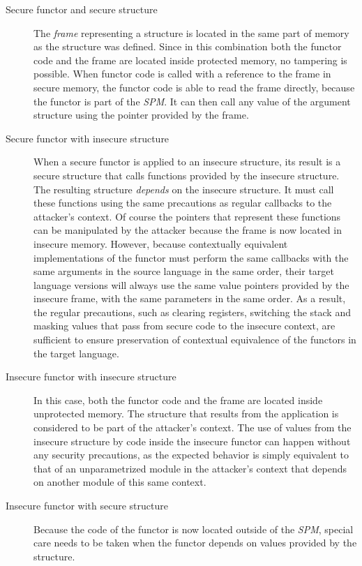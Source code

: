 \documentclass[10pt,a4paper,master=cws, masteroption=ai,english,inputenc=utf8]{kulemt}
\begin{document}
\begin{description}
\item[Secure functor and secure structure] 
The \emph{frame} representing a structure is located in the same part of memory as the structure was defined.
Since in this combination both the functor code and the frame are located inside protected memory, no tampering is possible.
When functor code is called with a reference to the frame in secure memory, the functor code is able to read the frame directly, because the functor is part of the \emph{SPM}. It can then call any value of the argument structure using the pointer provided by the frame.
\item[Secure functor with insecure structure]
When a secure functor is applied to an insecure structure, its result is a secure structure that calls functions provided by the insecure structure.
The resulting structure \emph{depends} on the insecure structure.
It must call these functions using the same precautions as regular callbacks to the attacker's context.
Of course the pointers that represent these functions can be manipulated by the attacker because the frame is now located in insecure memory.
However, because contextually equivalent implementations of the functor must perform the same callbacks with the same arguments in the source language in the same order, their target language versions will always use the same value pointers provided by the insecure frame, with the same parameters in the same order.
As a result, the regular precautions, such as clearing registers, switching the stack and masking values that pass from secure code to the insecure context, are sufficient to ensure preservation of contextual equivalence of the functors in the target language.
\item[Insecure functor with insecure structure]
In this case, both the functor code and the frame are located inside unprotected memory.
The structure that results from the application is considered to be part of the attacker's context.
The use of values from the insecure structure by code inside the insecure functor can happen without any security precautions, as the expected behavior is simply equivalent to that of an unparametrized module in the attacker's context that depends on another module of this same context.
\item[Insecure functor with secure structure]
Because the code of the functor is now located outside of the \emph{SPM}, special care needs to be taken when the functor depends on values provided by the structure.

\end{description}
\end{document}
